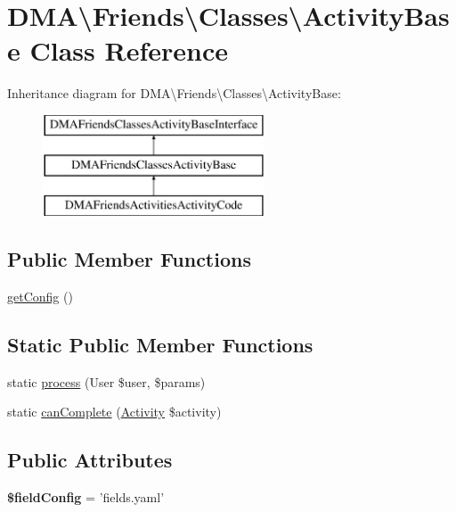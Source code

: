 \hypertarget{classDMA_1_1Friends_1_1Classes_1_1ActivityBase}{\section{D\+M\+A\textbackslash{}Friends\textbackslash{}Classes\textbackslash{}Activity\+Base Class Reference}
\label{classDMA_1_1Friends_1_1Classes_1_1ActivityBase}
}
Inheritance diagram for D\+M\+A\textbackslash{}Friends\textbackslash{}Classes\textbackslash{}Activity\+Base\+:\begin{figure}[H]
\begin{center}
\leavevmode
\includegraphics[height=3.000000cm]{d4/dfe/classDMA_1_1Friends_1_1Classes_1_1ActivityBase}
\end{center}
\end{figure}
\subsection*{Public Member Functions}
\begin{DoxyCompactItemize}
\item 
\hyperlink{classDMA_1_1Friends_1_1Classes_1_1ActivityBase_a93c34ca9ef2f3c2467b3e103e3ab1589}{get\+Config} ()
\end{DoxyCompactItemize}
\subsection*{Static Public Member Functions}
\begin{DoxyCompactItemize}
\item 
static \hyperlink{classDMA_1_1Friends_1_1Classes_1_1ActivityBase_a0aaec135ec1f7d5fda3ff579acfc5b22}{process} (User \$user, \$params)
\item 
static \hyperlink{classDMA_1_1Friends_1_1Classes_1_1ActivityBase_a01771f49733d9f827915653beccf461b}{can\+Complete} (\hyperlink{classDMA_1_1Friends_1_1Models_1_1Activity}{Activity} \$activity)
\end{DoxyCompactItemize}
\subsection*{Public Attributes}
\begin{DoxyCompactItemize}
\item 
\hypertarget{classDMA_1_1Friends_1_1Classes_1_1ActivityBase_a455b6cee79fab199d7f95eb0075bde8a}{{\bfseries \$field\+Config} = 'fields.\+yaml'}\label{classDMA_1_1Friends_1_1Classes_1_1ActivityBase_a455b6cee79fab199d7f95eb0075bde8a}

\end{DoxyCompactItemize}
